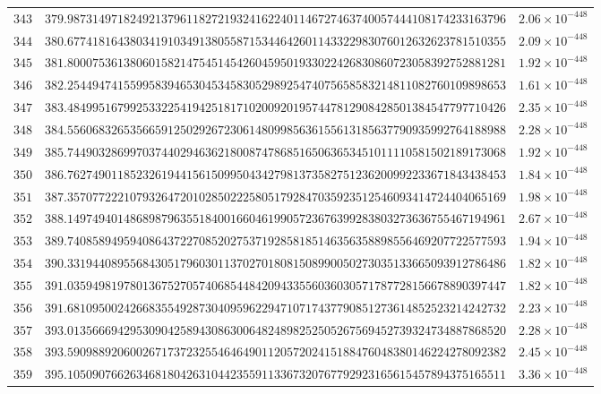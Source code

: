 \documentclass[12pt,reqno]{amsart}
\theoremstyle{remark}
\begin{document}
\begin{longtable}{clc}
$343$ & $379.9873149718249213796118272193241622401146727463740057444108174233163796$ & $2.06\times 10^{-448}$ \\
$344$ & $380.6774181643803419103491380558715344642601143322983076012632623781510355$ & $2.09\times 10^{-448}$ \\
$345$ & $381.8000753613806015821475451454260459501933022426830860723058392752881281$ & $1.92\times 10^{-448}$ \\
$346$ & $382.2544947415599583946530453458305298925474075658583214811082760109898653$ & $1.61\times 10^{-448}$ \\
$347$ & $383.4849951679925332254194251817102009201957447812908428501384547797710426$ & $2.35\times 10^{-448}$ \\
$348$ & $384.5560683265356659125029267230614809985636155613185637790935992764188988$ & $2.28\times 10^{-448}$ \\
$349$ & $385.7449032869970374402946362180087478685165063653451011110581502189173068$ & $1.92\times 10^{-448}$ \\
$350$ & $386.7627490118523261944156150995043427981373582751236200992233671843438453$ & $1.84\times 10^{-448}$ \\
$351$ & $387.3570772221079326472010285022258051792847035923512546093414724404065169$ & $1.98\times 10^{-448}$ \\
$352$ & $388.1497494014868987963551840016604619905723676399283803273636755467194961$ & $2.67\times 10^{-448}$ \\
$353$ & $389.7408589495940864372270852027537192858185146356358898556469207722577593$ & $1.94\times 10^{-448}$ \\
$354$ & $390.3319440895568430517960301137027018081508990050273035133665093912786486$ & $1.82\times 10^{-448}$ \\
$355$ & $391.0359498197801367527057406854484209433556036030571787728156678890397447$ & $1.82\times 10^{-448}$ \\
$356$ & $391.6810950024266835549287304095962294710717437790851273614852523214242732$ & $2.23\times 10^{-448}$ \\
$357$ & $393.0135666942953090425894308630064824898252505267569452739324734887868520$ & $2.28\times 10^{-448}$ \\
$358$ & $393.5909889206002671737232554646490112057202415188476048380146224278092382$ & $2.45\times 10^{-448}$ \\
$359$ & $395.1050907662634681804263104423559113367320767792923165615457894375165511$ & $3.36\times 10^{-448}$ \\

\end{longtable}
\end{document}
